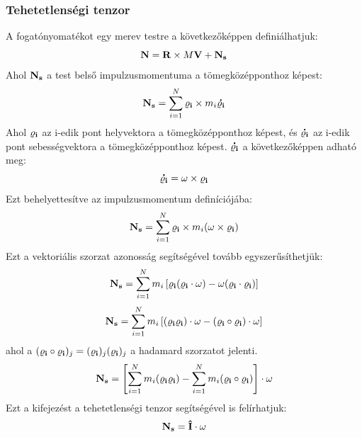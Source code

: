 \documentclass[a4paper,12pt]{article}
\begin{document}
\subsubsection{Tehetetlenségi tenzor}
A fogatónyomatékot egy merev testre a következőképpen definiálhatjuk:
\begin{equation}
    \bold{N} = \bold{R} \times M \bold{V} + \bold{N_s}
\end{equation}
Ahol $\bold{N_s}$ a test belső impulzusmomentuma a tömegközépponthoz képest:
\begin{equation}
    \bold{N_s} = \sum_{i=1}^{N} \bold{\varrho_i} \times m_i \bold{\dot{\varrho_i}}
\end{equation}
Ahol $\bold{\varrho_i}$ az i-edik pont helyvektora a tömegközépponthoz képest, és $\bold{\dot{\varrho_i}}$ az i-edik pont sebességvektora a tömegközépponthoz képest.
$\bold{\dot{\varrho_i}}$ a következőképpen adható meg:
\begin{equation}
    \bold{\dot{\varrho_i}} = \bold{\omega} \times \bold{\varrho_i}
\end{equation}
Ezt behelyettesítve az impulzusmomentum definíciójába:
\begin{equation}
    \bold{N_s} = \sum_{i=1}^{N} \bold{\varrho_i} \times m_i (\bold{\omega} \times \bold{\varrho_i})
\end{equation}
Ezt a vektoriális szorzat azonosság segítségével tovább egyszerűsíthetjük:
\begin{equation}
    \bold{N_s} = \sum_{i=1}^{N} m_i \left[\bold{\varrho_i} (\bold{\varrho_i} \cdot \bold{\omega}) - \bold{\omega} (\bold{\varrho_i} \cdot \bold{\varrho_i})\right]
\end{equation}
\begin{equation}
    \bold{N_s} = \sum_{i=1}^{N} m_i \left[(\bold{\varrho_i} \bold{\varrho_i}) \cdot \bold{\omega} - (\bold{\varrho_i} \circ \bold{\varrho_i}) \cdot \bold{\omega}\right]
\end{equation}
ahol a $(\bold{\varrho_i} \circ \bold{\varrho_i})_{j} = (\bold{\varrho_i})_{j} (\bold{\varrho_i})_{j}$ a hadamard szorzatot jelenti.
\begin{equation}
    \bold{N_s} = \left[\sum_{i=1}^{N} m_i (\bold{\varrho_i} \bold{\varrho_i}) - \sum_{i=1}^{N} m_i (\bold{\varrho_i} \circ \bold{\varrho_i})\right] \cdot \bold{\omega}
\end{equation}
Ezt a kifejezést a tehetetlenségi tenzor segítségével is felírhatjuk:
\begin{equation}
    \bold{N_s} = \bold{\hat{I}} \cdot \bold{\omega}
\end{equation}
\end{document}
